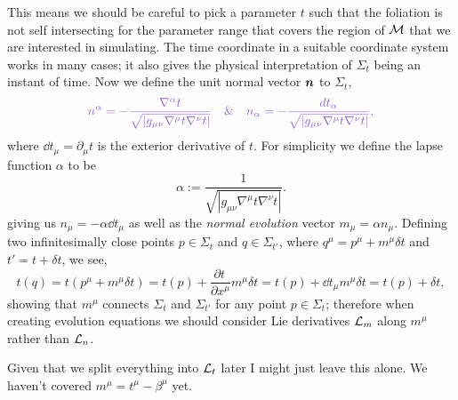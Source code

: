 This means we should be careful to pick a parameter $t$ such that the foliation is not self intersecting for the parameter range that covers the region of $\mathcal{M}$ that we are interested in simulating. The time coordinate in a suitable coordinate system works in many cases; it also gives the physical interpretation of $\Sigma_t$ being an instant of time. Now we define the unit normal vector $\boldsymbol{n}$ to $\Sigma_t$,
\begin{equation} \color{orchid}n^\alpha = -\frac{\nabla^\alpha t}{\sqrt{|g_{\mu\nu}\nabla^\mu t \nabla^\nu t|}} \quad \& \quad  n_\alpha = -\frac{dt_\alpha}{\sqrt{|g_{\mu\nu}\nabla^\mu t \nabla^\nu t|}},\color{black}\end{equation}
where $\dd t_\mu=\partial_\mu t$ is the exterior derivative of $t$.
For simplicity we define the lapse function $\alpha$ to be
\begin{equation}\alpha :=  \frac{1}{\sqrt{|g_{\mu\nu}\nabla^\mu t \nabla^\nu t|}}. \end{equation}
giving us $n_\mu = -\alpha \dd t_\mu$ as well as the {\it normal evolution} vector $m_\mu = \alpha n_\mu$. Defining two infinitesimally close points $p\in\Sigma_t$ and $q\in\Sigma_{t'}$, where $ q^\mu = p^\mu + m^\mu\delta t$ and $t' = t+ \delta t$, we see,
\begin{equation} t(q) = t(p^\mu +  m^\mu\delta t) = t(p) + \frac{\partial t^{\,}}{\partial x^\mu}m^\mu\delta t = t(p) + \dd t_\mu m^\mu \delta t =  t(p) + \delta t,\end{equation} 
showing that $m^\mu$ connects $\Sigma_t$ and $\Sigma_{t'}$ for any point $p\in \Sigma_t$; therefore when creating evolution equations we should consider Lie derivatives $\mathcal{L}_m$ along $m^\mu$ rather than $\mathcal{L}_n$.

\color{choral} Given that we split everything into $\mathcal{L}_t$ later I might just leave this alone. We haven't covered $m^\mu = t^\mu - \beta^\mu$ yet. \color{black}



